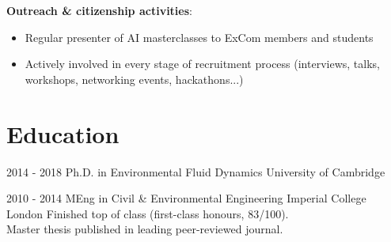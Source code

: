\documentclass[letterpaper]{twentysecondcv} %
\begin{document}
\begin{twenty}
{		\medskip
	
		\textbf{Outreach \& citizenship activities}:
			\begin{itemize}
				\item Regular presenter of AI masterclasses to ExCom members and students
				\item Actively involved in every stage of recruitment process (interviews, talks, workshops, networking events, hackathons...)
			\end{itemize}
	}
	
	\end{twenty}
	
	\vspace{-0.25cm}
	\section{Education}{\faGraduationCap}
	
	\begin{twenty} %
		\twentyitemshorttest
		{2014 - 2018}
		{}
		{Ph.D. in Environmental Fluid Dynamics}
		{University of Cambridge}
		{}
		
		\twentyitemshorttest
		{2010 - 2014}
		{}
		{MEng in Civil \& Environmental Engineering}
		{Imperial College London}
		{Finished top of class (first-class honours, 83/100). \\Master thesis published in leading peer-reviewed journal.}
	
	\end{twenty}
	
\end{document}
